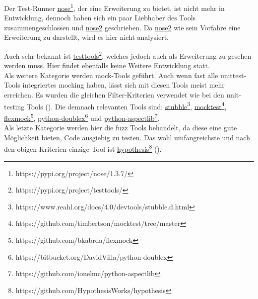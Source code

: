 Der Test-Runner
\href{https://pypi.org/project/nose/1.3.7/}{nose}\footnote{https://pypi.org/project/nose/1.3.7/},
der eine Erweiterung zu  bietet, ist nicht mehr
in Entwicklung, dennoch haben sich ein paar Liebhaber des Tools
zusammengeschlossen und
\href{https://pypi.org/project/nose2/}{nose2}
geschrieben. Da \href{https://pypi.org/project/nose2/}{nose2}
wie sein Vorfahre eine Erweiterung zu  darstellt,
wird es hier nicht analysiert.

Auch sehr bekannt ist \href{https://pypi.org/project/testtools/}{testtools}\footnote{https://pypi.org/project/testtools/}, welches jedoch auch als
Erweiterung zu  gesehen werden muss. Hier findet
ebenfalls keine Weitere Entwicklung statt.
\newline
\\
Als weitere Kategorie werden \Gls{mock}-Tools geführt. Auch wenn fast alle
unittest-Tools integriertes \gls{mock}ing haben, lässt sich mit diesen
Tools meist mehr erreichen. Es wurden die gleichen Filter-Kriterien verwendet
wie bei den unit-testing Tools (\cite{wiki.python:PythonTestingToolsTaxonomy}).
Die demnach relevanten Tools sind:
\href{https://www.reahl.org/docs/4.0/devtools/stubble.d.html}{stubble}\footnote{https://www.reahl.org/docs/4.0/devtools/stubble.d.html},
\href{https://github.com/timbertson/mocktest/tree/master}{mocktest}\footnote{https://github.com/timbertson/mocktest/tree/master},
\href{https://github.com/bkabrda/flexmock}{flexmock}\footnote{https://github.com/bkabrda/flexmock},
\href{https://bitbucket.org/DavidVilla/python-doublex}{python-doublex}\footnote{https://bitbucket.org/DavidVilla/python-doublex}
und 
\href{https://github.com/ionelmc/python-aspectlib}{python-aspectlib}\footnote{https://github.com/ionelmc/python-aspectlib}.
\newline
\\
Als letzte Kategorie werden hier die \Gls{fuzz} Tools behandelt, da diese eine
gute Möglichkeit bieten, Code ausgiebig zu testen. Das wohl umfangreichste und
nach den obigen Kriterien einzige Tool ist
\href{https://github.com/HypothesisWorks/hypothesis}{hypothesis}\footnote{https://github.com/HypothesisWorks/hypothesis}
(\cite{wiki.python:PythonTestingToolsTaxonomy}).




